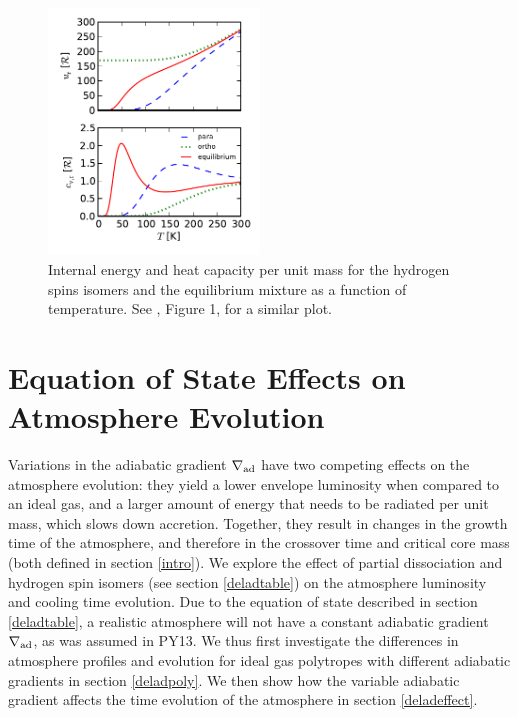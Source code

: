 \documentclass[apj]{emulateapj}
\newcommand{\delad}{\nabla_{\rm ad}}
\begin{document}
\begin{figure}[h]
\centering
\includegraphics[width=0.5\textwidth]{../../figs/ModelAtmospheres/RadSelfGravRealEOS/PaperFigs/ortho_para_energy.pdf}
\caption{Internal energy and heat capacity per unit mass for the hydrogen spins isomers and the equilibrium mixture as a function of temperature. See \citet{farkas35}, Figure 1, for a similar plot.}
\label{fig:ucvr}
\end{figure}




\section{Equation of State Effects on Atmosphere Evolution}
\label{EOSeffects}

Variations in the adiabatic gradient $\delad$ have two competing effects on the atmosphere evolution: they yield a lower envelope luminosity when compared to an ideal gas, and a larger amount of energy that needs to be radiated per unit mass, which slows down accretion. Together, they result in changes in the growth time of the atmosphere, and therefore in the crossover time and critical core mass (both defined in section \ref{intro}). We explore the effect of partial dissociation and hydrogen spin isomers (see section \ref{deladtable}) on the atmosphere luminosity and cooling time evolution. Due to the equation of state described in section \ref{deladtable}, a realistic atmosphere will not have a constant adiabatic gradient $\delad$, as was assumed in PY13. We thus first investigate the differences in atmosphere profiles and evolution for ideal gas polytropes with different adiabatic gradients in section \ref{deladpoly}. We then show how the variable adiabatic gradient affects the time evolution of the atmosphere in section \ref{deladeffect}.
\end{document}
